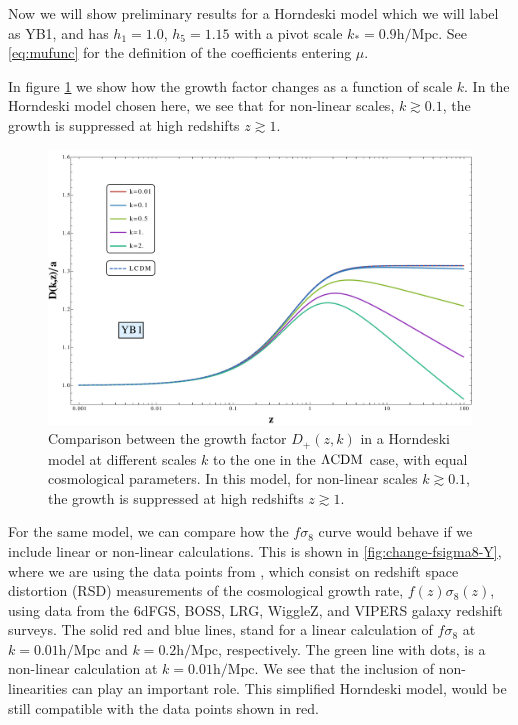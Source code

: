Now we will show preliminary results for a Horndeski model which we will label as YB1, and
has $h_1 = 1.0$, $h_5 = 1.15$ with a pivot scale $k_{*} = 0.9 \textrm{h/Mpc}$. See \cref{eq:mufunc} for the definition of the coefficients
entering $\mu$.

In figure \cref{fig:change-Dplus-Y} we show how the growth factor 
changes as a function of scale $k$. In the Horndeski model chosen here, we see that
for non-linear scales, $k \gtrsim 0.1$, the growth 
is suppressed at high redshifts $z\gtrsim 1$.
\begin{figure}[tbph]
	\centering
	\includegraphics[width=0.7\linewidth]{Chapters/resummation-plots/Dgrowth-YB1}
	\caption[Growth factor in Horndeski.]{Comparison between the growth factor $D_{+}(z,k)$ in a Horndeski model at different
	scales $k$ to the one in the $\Lambda\mathrm{CDM}$ case, with equal cosmological parameters. In this model, for non-linear scales $k \gtrsim 0.1$, the growth 
is suppressed at high redshifts $z\gtrsim 1$.}
	\label{fig:change-Dplus-Y}
\end{figure}
For the same model, we can compare how the $f \sigma_{8}$ curve would behave if we include linear or non-linear calculations. This is
shown in \cref{fig:change-fsigma8-Y}, where we are using the data points from \cite{macaulay2013lower}, which consist on redshift space distortion (RSD) measurements of the cosmological growth rate, $f(z)\sigma_{8}(z)$, using data from the 6dFGS, BOSS, LRG, WiggleZ, and VIPERS galaxy redshift surveys.
The solid red and blue lines, stand for a linear calculation of $f \sigma_{8}$ at $k=0.01 \mathrm{h/Mpc}$ and 
$k=0.2 \mathrm{h/Mpc}$, respectively. The green line with dots, is a non-linear calculation at  $k=0.01 \mathrm{h/Mpc}$.
We see that the inclusion of non-linearities can play an important role. This simplified Horndeski model, would be still compatible
with the data points shown in red.

